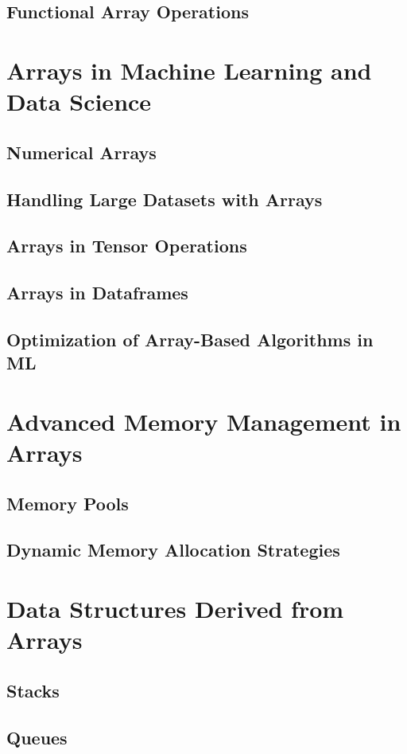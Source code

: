 \documentclass[12pt, oneside]{book}
\begin{document}
	\section{Functional Array Operations}
	
	\chapter{Arrays in Machine Learning and Data Science}
	\section{Numerical Arrays}
	\section{Handling Large Datasets with Arrays}
	\section{Arrays in Tensor Operations}
	\section{Arrays in Dataframes}
	\section{Optimization of Array-Based Algorithms in ML}
	
	\chapter{Advanced Memory Management in Arrays}
	\section{Memory Pools}
	\section{Dynamic Memory Allocation Strategies}
	
	\chapter{Data Structures Derived from Arrays}
	\section{Stacks}
	\section{Queues}
\end{document}
